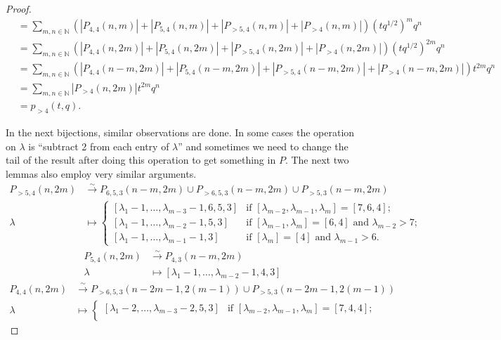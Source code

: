 \documentclass[a4paper, 12pt, reqno]{amsart}
\theoremstyle{remark}
\numberwithin{equation}{subsection}
\begin{document}
\begin{proof}
\begin{align*}
    &= \sum_{m, n \in \mathbb{N}}(|P_{4, 4}(n, m)| + |P_{5, 4}(n, m)| + |P_{>5, 4}(n, m)| + |P_{>4}(n, m)|)(tq^{1/2})^mq^n \\
    &= \sum_{m, n \in \mathbb{N}}(|P_{4, 4}(n, 2m)| + |P_{5, 4}(n, 2m)| + |P_{>5, 4}(n, 2m)| + |P_{>4}(n, 2m)|)(tq^{1/2})^{2m}q^n \\
    &= \sum_{m, n \in \mathbb{N}}(|P_{4, 4}(n - m, 2m)| + |P_{5, 4}(n - m, 2m)| + |P_{>5, 4}(n - m, 2m)| + |P_{>4}(n - m, 2m)|)t^{2m}q^n \\
    &= \sum_{m, n \in \mathbb{N}}|P_{>4}(n, 2m)|t^{2m}q^n \\
    &= p_{>4}(t, q).
  \end{align*}
  
  In the next bijections, similar observations are done.
  In some cases the operation on $\lambda$ is ``subtract 2 from each entry of $\lambda$'' and sometimes we need to change the tail of the result after doing this operation to get something in $P$.
  The next two lemmas also employ very similar arguments.
  \begin{align*}
    P_{>5, 4}(n, 2m) &\xrightarrow{\sim} P_{6, 5, 3}(n - m, 2m) \cup P_{>6, 5, 3}(n - m, 2m) \cup P_{>5, 3}(n - m, 2m) \\
    \lambda &\mapsto
              \begin{cases}
                [\lambda_1 - 1, \dots, \lambda_{m - 3} - 1, 6, 5, 3] &\text{if }[\lambda_{m - 2}, \lambda_{m - 1}, \lambda_m] = [7, 6, 4]; \\
                [\lambda_1 - 1, \dots, \lambda_{m - 2} - 1, 5, 3] &\text{if }[\lambda_{m - 1}, \lambda_m] = [6, 4]\text{ and }\lambda_{m - 2} > 7; \\
                [\lambda_1 - 1, \dots, \lambda_{m - 1} - 1, 3] &\text{if }[\lambda_m] = [4]\text{ and }\lambda_{m - 1} > 6.
              \end{cases}
  \end{align*}
  \begin{align*}
    P_{5, 4}(n, 2m) &\xrightarrow{\sim} P_{4, 3}(n - m, 2m) \\
    \lambda &\mapsto [\lambda_1 - 1, \dots, \lambda_{m - 2} - 1, 4, 3]
  \end{align*}
  \begin{align*}
    P_{4, 4}(n, 2m) &\xrightarrow{\sim} P_{>6, 5, 3}(n - 2m - 1, 2(m - 1)) \cup P_{>5, 3}(n - 2m - 1, 2(m - 1)) \\
    \lambda &\mapsto
              \begin{cases}
                [\lambda_1 - 2, \dots, \lambda_{m - 3} - 2, 5, 3] &\text{if }[\lambda_{m - 2}, \lambda_{m - 1}, \lambda_m] = [7, 4, 4]; \\

\end{cases}
\end{align*}
\end{proof}
\end{document}
